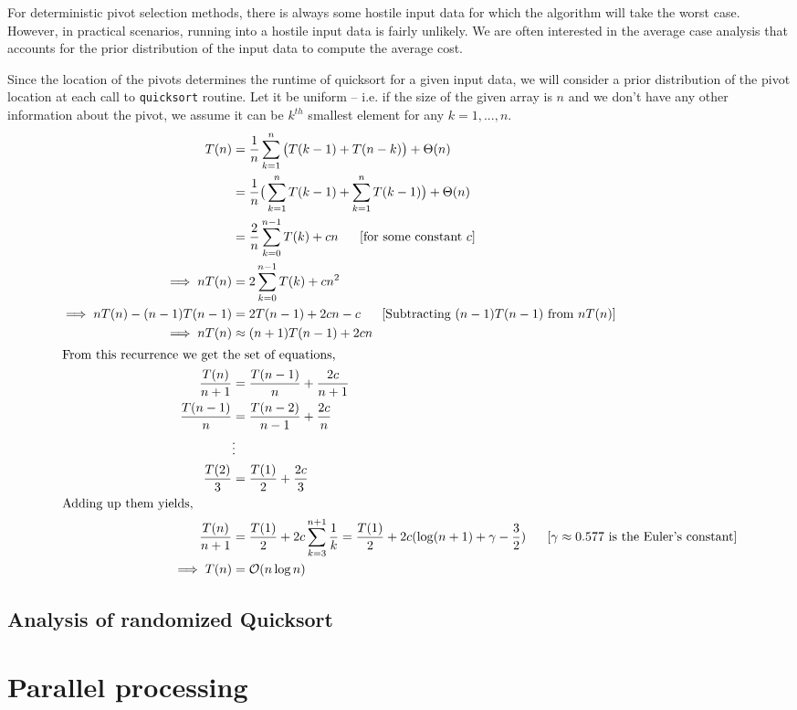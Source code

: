 \documentclass[]{finalproject}
\begin{document}
For deterministic pivot selection methods, there is always some hostile input data for which the algorithm will take the worst case. However, in practical scenarios, running into a hostile input data is fairly unlikely. We are often interested in the average case analysis that accounts for the prior distribution of the input data to compute the average cost.

Since the location of the pivots determines the runtime of quicksort for a given input data, we will consider a prior distribution of the pivot location at each call to \texttt{quicksort} routine. Let it be uniform -- i.e. if the size of the given array is $n$ and we don't have any other information about the pivot, we assume it can be $k^{th}$ smallest element for any $k = 1, ..., n$.
\begin{align*}
T(n) &= \frac{1}{n}\sum_{k=1}^{n}\big(T(k-1) + T(n-k)\big) + \Theta(n) \\
&= \frac{1}{n}\big(\sum_{k=1}^{n}T(k-1) + \sum_{k=1}^{n}T(k-1)\big) + \Theta(n) \\
&= \frac{2}{n}\sum_{k=0}^{n-1}T(k) + cn ~~~~~[\text{for some constant $c$}]\\
\implies nT(n) &= 2\sum_{k=0}^{n-1}T(k) + cn^2 \\
\implies nT(n) - (n-1)T(n-1) &= 2T(n-1) + 2cn - c ~~~~~[\text{Subtracting $(n-1)T(n-1)$ from $nT(n)$}]\\
\implies nT(n) &\approx (n+1)T(n-1) + 2cn \\
\intertext{From this recurrence we get the set of equations,}
\frac{T(n)}{n+1} &= \frac{T(n-1)}{n} + \frac{2c}{n+1} \\
\frac{T(n-1)}{n} &= \frac{T(n-2)}{n-1} + \frac{2c}{n} \\
&\vdots \\
\frac{T(2)}{3} &= \frac{T(1)}{2} + \frac{2c}{3} \\
\intertext{Adding up them yields,}
\frac{T(n)}{n+1} &=  \frac{T(1)}{2} + 2c \sum_{k=3}^{n+1}\frac{1}{k} = \frac{T(1)}{2} + 2c(\log(n+1) + \gamma - \frac{3}{2}) ~~~~~[\text{$\gamma \approx 0.577$ is the Euler's constant}] \\
\implies T(n) &= \mathcal{O}(n\log n)
\end{align*}

\subsection{Analysis of randomized Quicksort}

\section{Parallel processing}
\end{document}
